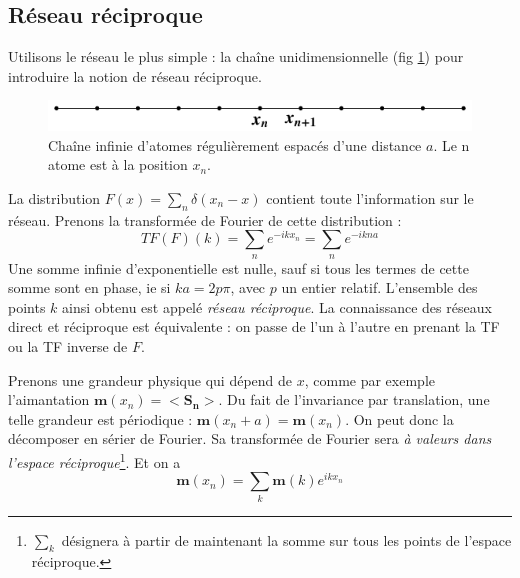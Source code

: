 \documentclass[a4paper, french]{report}
\newcommand{\M}[1]{\ensuremath{\mathbf{m}(#1)}\xspace}
\newcommand{\1}{\ensuremath{\ket{\om_1\bom_1}}\xspace}
\newcommand{\2}{\ensuremath{\ket{\om_2\bom_2}}\xspace}
\begin{document}
\subsection{Réseau réciproque}
Utilisons le réseau le plus simple : la chaîne unidimensionnelle (fig \ref{fig:chain}) pour introduire la notion de réseau réciproque.
\begin{figure}[tp]
\centering
\includegraphics[scale=1.0]{vector_img/chaine.pdf}
\caption{Chaîne infinie d'atomes régulièrement espacés d'une distance $a$. Le n atome est à la position $x_n$.}
\label{fig:chain}
\end{figure} 
La distribution $F(x)=\sum_n\delta(x_n-x)$ contient toute l'information sur le réseau.
Prenons la transformée de Fourier de cette distribution :
\[
		TF(F)(k)=\sum_{n}e^{-ikx_n}=\sum_{n}e^{-ikna}
\]
Une somme infinie d'exponentielle est nulle, sauf si tous les termes de cette somme sont en phase, ie si $ka=2p\pi$, avec $p$ un entier relatif. L'ensemble des points $k$ ainsi obtenu est appelé \emph{réseau réciproque}.
La connaissance des réseaux direct et réciproque est équivalente : on passe de l'un à l'autre en prenant la TF ou la TF inverse de $F$.

Prenons une grandeur physique qui dépend de $x$, comme par exemple l'aimantation $\M{x_n}=<\mathbf{S_n}>$. Du fait de l'invariance par translation, une telle grandeur est périodique : $\M{x_n+a}=\M{x_n}$. On peut donc la décomposer en sérier de Fourier. Sa transformée de Fourier sera \emph{à valeurs dans l'espace réciproque}\footnote{$\sum_{k}$ désignera à partir de maintenant la somme sur tous les points de l'espace réciproque.}. Et on a
\begin{equation}
\label{eq:fourierinf}
	\M{x_n}=\sum_k\M{k}e^{ikx_n}
\end{equation}
\end{document}
